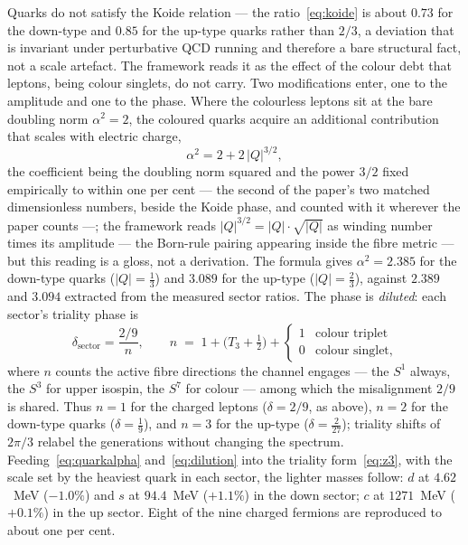 Quarks do not satisfy the Koide relation --- the ratio~\eqref{eq:koide} is about $0.73$ for the
down-type and $0.85$ for the up-type quarks rather than $2/3$, a deviation that is invariant under
perturbative QCD running and therefore a bare structural fact, not a scale artefact. The framework
reads it as the effect of the colour debt that leptons, being colour singlets, do not carry. Two
modifications enter, one to the amplitude and one to the phase. Where the colourless leptons sit at
the bare doubling norm $\alpha^2 = 2$, the coloured quarks acquire an additional contribution that
scales with electric charge,
\begin{equation}
  \alpha^2 = 2 + 2\,|Q|^{3/2},
  \label{eq:quarkalpha}
\end{equation}
the coefficient being the doubling norm squared and the power $3/2$ fixed empirically to within one
per cent --- the second of the paper's two matched dimensionless numbers, beside the Koide phase,
and counted with it wherever the paper counts ---; the framework reads $|Q|^{3/2} = |Q|\cdot\sqrt{|Q|}$
as winding number times its
amplitude --- the Born-rule pairing appearing inside the fibre metric --- but this reading is a
gloss, not a derivation. The formula gives $\alpha^2 = 2.385$ for the down-type quarks
($|Q|=\tfrac13$) and $3.089$ for the up-type ($|Q|=\tfrac23$), against $2.389$ and $3.094$ extracted
from the measured sector ratios. The phase is \emph{diluted}: each sector's triality phase is
\begin{equation}
  \delta_{\mathrm{sector}} = \frac{2/9}{n},
  \qquad
  n \;=\; 1 + \bigl(T_3 + \tfrac12\bigr) +
  \begin{cases}1 & \text{colour triplet}\\[2pt] 0 & \text{colour singlet,}\end{cases}
  \label{eq:dilution}
\end{equation}
where $n$ counts the active fibre directions the channel engages --- the $S^1$ always, the $S^3$
for upper isospin, the $S^7$ for colour --- among which the misalignment $2/9$ is shared. Thus
$n = 1$ for the charged leptons ($\delta = 2/9$, as above), $n = 2$ for the down-type quarks
($\delta = \tfrac19$), and $n = 3$ for the up-type ($\delta = \tfrac{2}{27}$); triality shifts of
$2\pi/3$ relabel the generations without changing the spectrum.
Feeding~\eqref{eq:quarkalpha} and~\eqref{eq:dilution} into the triality form~\eqref{eq:z3}, with the
scale set by the heaviest quark in each sector, the lighter masses follow: $d$ at $4.62$~MeV
($-1.0\%$) and $s$ at $94.4$~MeV ($+1.1\%$) in the down sector; $c$ at $1271$~MeV ($+0.1\%$) in the
up sector. Eight of the nine charged fermions are reproduced to about one per cent.

